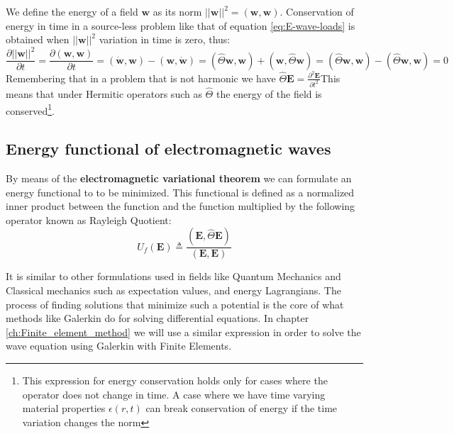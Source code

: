 We define the energy of a field $\mathbf{w}$ as its norm $||\mathbf{w}||^2 = \left(\mathbf{w},\mathbf{w}\right)$.
Conservation of energy in time in a source-less problem like that of equation \ref{eq:E-wave-loads} is obtained when $||\mathbf{w}||^2$ variation in time is zero, thus:
\begin{equation}
\frac{\partial ||\mathbf{w}||^2}{\partial t} =\frac{\partial \left(\mathbf{w},\mathbf{w}\right)}{\partial t} = \left(\dot{\mathbf{w}},\mathbf{w}\right)-\left(\mathbf{w},\dot{\mathbf{w}}\right) = \left(\hat{\Theta}\mathbf{w},\mathbf{w}\right)+\left(\mathbf{w},\hat{\Theta}\mathbf{w}\right) = \left(\hat{\Theta}\mathbf{w},\mathbf{w}\right)-\left(\hat{\Theta}\mathbf{w},\mathbf{w}\right) = 0
\end{equation}
Remembering that in a problem that is not harmonic we have $\hat{\Theta}\mathbf{E} = \frac{\partial^2 \mathbf{E}}{\partial t^2}$This means that under Hermitic operators such as $\hat{\Theta}$ the energy of the field is conserved\footnote{This expression for energy conservation holds only for cases where the operator does not change in time. A case where we have time varying material properties $\epsilon(r,t)$ can break conservation of energy if the time variation changes the norm\cite{Johnson07noteson}}.

\subsection{Energy functional of electromagnetic waves}
 
By means of the \textbf{electromagnetic variational theorem} we can formulate an energy functional to  to be minimized. This functional is defined as a normalized inner product between the function and the function multiplied by the following operator known as Rayleigh Quotient:
\begin{equation}
U_f(\mathbf{E}) \triangleq \frac{\left(\mathbf{E}, \hat{\Theta} \mathbf{E}\right)}{\left(\mathbf{E},\mathbf{E}\right)}
\label{eq:energy_functional}
\end{equation}

It is similar to other formulations used in fields like Quantum Mechanics and Classical mechanics such as expectation values, and energy Lagrangians.  The process of finding solutions that minimize such a potential is the core of what methods like Galerkin do for solving differential equations. In chapter \ref{ch:Finite_element_method} we will use a similar expression in order to solve the wave equation using Galerkin with Finite Elements.
 